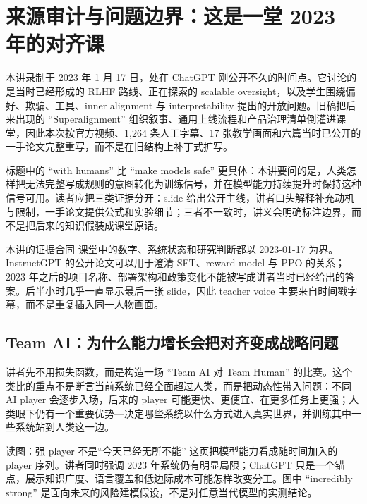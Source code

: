 \section{来源审计与问题边界：这是一堂 2023 年的对齐课}

本讲录制于 2023 年 1 月 17 日，处在 ChatGPT 刚公开不久的时间点。它讨论的是当时已经形成的 RLHF 路线、正在探索的 scalable oversight，以及学生围绕偏好、欺骗、工具、inner alignment 与 interpretability 提出的开放问题。旧稿把后来出现的 ``Superalignment'' 组织叙事、通用上线流程和产品治理清单倒灌进课堂，因此本次按官方视频、1,264 条人工字幕、17 张教学画面和六篇当时已公开的一手论文完整重写，而不是在旧结构上补丁式扩写。


标题中的 ``with humans'' 比 ``make models safe'' 更具体：本讲要问的是，人类怎样把无法完整写成规则的意图转化为训练信号，并在模型能力持续提升时保持这种信号可用。读者应把三类证据分开：slide 给出公开主线，讲者口头解释补充动机与限制，一手论文提供公式和实验细节；三者不一致时，讲义会明确标注边界，而不是把后来的知识假装成课堂原话。

\begin{importantbox}{本讲的证据合同}
课堂中的数字、系统状态和研究判断都以 2023-01-17 为界。InstructGPT 的公开论文可以用于澄清 SFT、reward model 与 PPO 的关系；2023 年之后的项目名称、部署架构和政策变化不能被写成讲者当时已经给出的答案。后半小时几乎一直显示最后一张 slide，因此 teacher voice 主要来自时间戳字幕，而不是重复插入同一人物画面。
\end{importantbox}

\subsection{Team AI：为什么能力增长会把对齐变成战略问题}

讲者先不用损失函数，而是构造一场 ``Team AI 对 Team Human'' 的比赛。这个类比的重点不是断言当前系统已经全面超过人类，而是把动态性带入问题：不同 AI player 会逐步入场，后来的 player 可能更快、更便宜、在更多任务上更强；人类眼下仍有一个重要优势---决定哪些系统以什么方式进入真实世界，并训练其中一些系统站到人类这一边。


\begin{knowledgebox}{读图：强 player 不是“今天已经无所不能”}
这页把模型能力看成随时间加入的 player 序列。讲者同时强调 2023 年系统仍有明显局限；ChatGPT 只是一个锚点，展示知识广度、语言覆盖和低边际成本可能怎样改变分工。图中 ``incredibly strong'' 是面向未来的风险建模假设，不是对任意当代模型的实测结论。
\end{knowledgebox}


